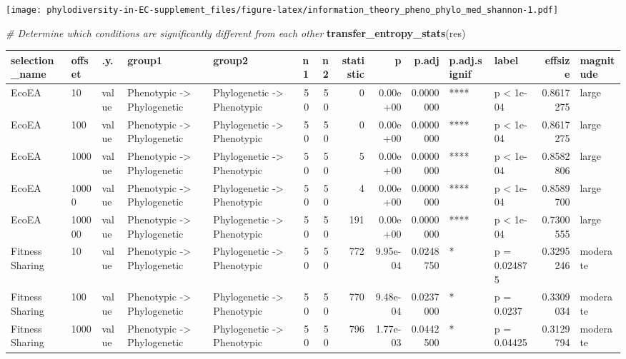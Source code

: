 \documentclass[]{book}
\newenvironment{Shaded}{\begin{snugshade}}{\end{snugshade}}
\newcommand{\CommentTok}[1]{\textcolor[rgb]{0.56,0.35,0.01}{\textit{#1}}}
\newcommand{\KeywordTok}[1]{\textcolor[rgb]{0.13,0.29,0.53}{\textbf{#1}}}
\newcommand{\NormalTok}[1]{#1}
\begin{document}
\texttt{[image: phylodiversity-in-EC-supplement\_files/figure-latex/information\_theory\_pheno\_phylo\_med\_shannon-1.pdf]}

\begin{Shaded}
\begin{Highlighting}[]
\CommentTok{# Determine which conditions are significantly different from each other}
\KeywordTok{transfer_entropy_stats}\NormalTok{(res)}
\end{Highlighting}
\end{Shaded}

\begin{table}
\centering
\begin{tabular}[t]{l|l|l|l|l|r|r|r|r|r|l|l|r|l}
\hline
selection\_name & offset & .y. & group1 & group2 & n1 & n2 & statistic & p & p.adj & p.adj.signif & label & effsize & magnitude\\
\hline
EcoEA & 10 & value & Phenotypic
    ->
Phylogenetic & Phylogenetic
    ->
Phenotypic & 50 & 50 & 0 & 0.00e+00 & 0.0000000 & **** & p < 1e-04 & 0.8617275 & large\\
\hline
EcoEA & 100 & value & Phenotypic
    ->
Phylogenetic & Phylogenetic
    ->
Phenotypic & 50 & 50 & 0 & 0.00e+00 & 0.0000000 & **** & p < 1e-04 & 0.8617275 & large\\
\hline
EcoEA & 1000 & value & Phenotypic
    ->
Phylogenetic & Phylogenetic
    ->
Phenotypic & 50 & 50 & 5 & 0.00e+00 & 0.0000000 & **** & p < 1e-04 & 0.8582806 & large\\
\hline
EcoEA & 10000 & value & Phenotypic
    ->
Phylogenetic & Phylogenetic
    ->
Phenotypic & 50 & 50 & 4 & 0.00e+00 & 0.0000000 & **** & p < 1e-04 & 0.8589700 & large\\
\hline
EcoEA & 100000 & value & Phenotypic
    ->
Phylogenetic & Phylogenetic
    ->
Phenotypic & 50 & 50 & 191 & 0.00e+00 & 0.0000000 & **** & p < 1e-04 & 0.7300555 & large\\
\hline
Fitness Sharing & 10 & value & Phenotypic
    ->
Phylogenetic & Phylogenetic
    ->
Phenotypic & 50 & 50 & 772 & 9.95e-04 & 0.0248750 & * & p = 0.024875 & 0.3295246 & moderate\\
\hline
Fitness Sharing & 100 & value & Phenotypic
    ->
Phylogenetic & Phylogenetic
    ->
Phenotypic & 50 & 50 & 770 & 9.48e-04 & 0.0237000 & * & p = 0.0237 & 0.3309034 & moderate\\
\hline
Fitness Sharing & 1000 & value & Phenotypic
    ->
Phylogenetic & Phylogenetic
    ->
Phenotypic & 50 & 50 & 796 & 1.77e-03 & 0.0442500 & * & p = 0.04425 & 0.3129794 & moderate\\

\end{tabular}
\end{table}
\end{document}
